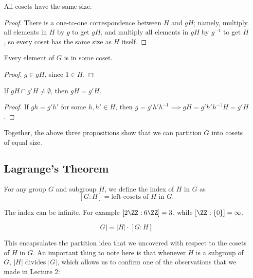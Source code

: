 \begin{theorem}
\proplabel

All cosets have the same size.
\end{theorem}

\begin{proof}
There is a one-to-one correspondence between $H$ and $gH$; namely, multiply all elements in $H$ by $g$ to get $gH$, and multiply all elements in $gH$ by $g^{-1}$ to get $H$, so every coset has the same size as $H$ itself. 
\end{proof}

\begin{theorem}
\proplabel

Every element of $G$ is in some coset.
\end{theorem}

\begin{proof}
$g\in gH$, since $1\in H$. 
\end{proof}

\begin{theorem}
\proplabel

If $gH\cap g'H\neq \emptyset$, then $gH=g'H$. 
\end{theorem}

\begin{proof}
If $gh=g'h'$ for some $h,h'\in H$, then $g=g'h'h^{-1}\implies gH = g'h'h^{-1}H=g'H$. 
\end{proof}

Together, the above three propositions show that we can partition $G$ into cosets of equal size. 

\subsection{Lagrange's Theorem}

\begin{definition}

For any group $G$ and subgroup $H$, we define the \ac{index} of $H$ in $G$ as
\[[G:H] = \text{left cosets of }H\text{ in }G.\]
\end{definition}

The index can be infinite. For example $[2\ZZ:6\ZZ]=3$, while $[\ZZ:\{0\}]=\infty$.

\begin{theorem}
\[\vert G\vert = \vert H\vert\cdot [G:H].\]
\end{theorem}
This encapsulates the partition idea that we uncovered with respect to the cosets of $H$ in $G$. An important thing to note here is that whenever $H$ is a subgroup of $G$, $\vert H\vert$ divides $\vert G\vert$, which allows us to confirm one of the observations that we made in Lecture 2: 

